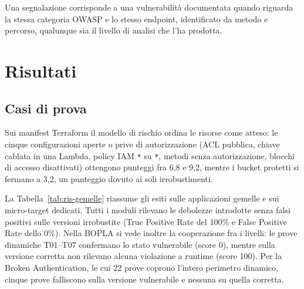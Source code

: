 Una segnalazione corrisponde a una vulnerabilità documentata quando riguarda
la stessa categoria OWASP e lo stesso endpoint, identificato da metodo e
percorso, qualunque sia il livello di analisi che l'ha prodotta.

\section{Risultati}
\label{sec:ris-risultati}

\subsection{Casi di prova}

Sui manifest Terraform il modello di rischio ordina le risorse come atteso: le
cinque configurazioni aperte o prive di autorizzazione (ACL pubblica, chiave
cablata in una Lambda, policy IAM \texttt{*} su \texttt{*}, metodi senza
autorizzazione, blocchi di accesso disattivati) ottengono punteggi fra 6,8 e
9,2, mentre i bucket protetti si fermano a 3,2, un punteggio dovuto ai soli
irrobustimenti.

La Tabella~\ref{tab:ris-gemelle} riassume gli esiti sulle applicazioni
gemelle e sui micro-target dedicati. Tutti i moduli rilevano le debolezze introdotte senza falsi positivi
sulle versioni irrobustite (True Positive Rate del 100\% e False Positive Rate dello 0\%).
Nella BOPLA si vede inoltre la cooperazione fra i livelli: le prove dinamiche
T01--T07 confermano lo stato vulnerabile (score 0), mentre sulla versione corretta
non rilevano alcuna violazione a runtime (score 100). Per la Broken Authentication,
le cui 22 prove coprono l'intero perimetro dinamico, cinque prove falliscono
sulla versione vulnerabile e nessuna su quella corretta.

